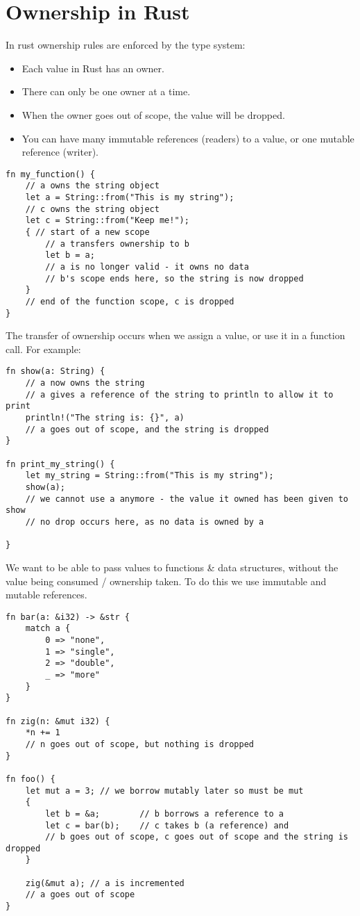 \section{Ownership in Rust}
In rust ownership rules are enforced by the type system:
\begin{itemize}
    \item Each value in Rust has an owner.
    \item There can only be one owner at a time.
    \item When the owner goes out of scope, the value will be dropped.
    \item You can have many immutable references (readers) to a value, or one mutable reference (writer).
\end{itemize}
\begin{verbatim}
fn my_function() {
    // a owns the string object
    let a = String::from("This is my string");
    // c owns the string object
    let c = String::from("Keep me!");
    { // start of a new scope
        // a transfers ownership to b
        let b = a;
        // a is no longer valid - it owns no data
        // b's scope ends here, so the string is now dropped
    }
    // end of the function scope, c is dropped
}
\end{verbatim}

The transfer of ownership occurs when we assign a value, or use it in a function call. For example:
\begin{verbatim}
fn show(a: String) {
    // a now owns the string
    // a gives a reference of the string to println to allow it to print
    println!("The string is: {}", a)
    // a goes out of scope, and the string is dropped
}

fn print_my_string() {
    let my_string = String::from("This is my string");
    show(a);
    // we cannot use a anymore - the value it owned has been given to show
    // no drop occurs here, as no data is owned by a

}
\end{verbatim}

We want to be able to pass values to functions \& data structures, without the value being consumed / ownership taken. To do this we use immutable and mutable references.
\begin{verbatim}
fn bar(a: &i32) -> &str {
    match a {
        0 => "none",
        1 => "single",
        2 => "double",
        _ => "more"
    }
}

fn zig(n: &mut i32) {
    *n += 1
    // n goes out of scope, but nothing is dropped
}

fn foo() {
    let mut a = 3; // we borrow mutably later so must be mut
    {
        let b = &a;        // b borrows a reference to a
        let c = bar(b);    // c takes b (a reference) and 
        // b goes out of scope, c goes out of scope and the string is dropped
    }

    zig(&mut a); // a is incremented
    // a goes out of scope
}
\end{verbatim}


